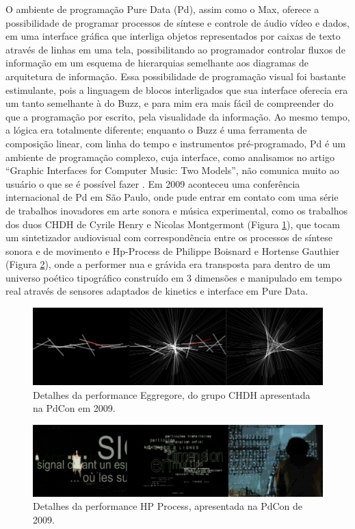 O ambiente de programação Pure Data (Pd), assim como o Max, oferece a possibilidade de programar processos de síntese e controle de áudio vídeo e dados, em uma interface gráfica que interliga objetos representados por caixas de texto através de linhas em uma tela, possibilitando ao programador controlar fluxos de informação em um esquema de hierarquias semelhante aos diagramas de arquitetura de informação. Essa possibilidade de programação visual foi bastante estimulante, pois a linguagem de blocos interligados que sua interface oferecia era um tanto semelhante à do Buzz, e para mim era mais fácil de compreender do que a programação por escrito, pela visualidade da informação. Ao mesmo tempo, a lógica era totalmente diferente; enquanto o Buzz é uma ferramenta de composição linear, com linha do tempo e instrumentos pré-programado, Pd é um ambiente de programação complexo, cuja interface, como analisamos no artigo ``Graphic Interfaces for Computer Music: Two Models'', não comunica muito ao usuário o que se é possível fazer \cite{Stolfi2016}. 
Em 2009 aconteceu uma conferência internacional de Pd em São Paulo, onde pude entrar em contato com uma série de trabalhos inovadores em arte sonora e música experimental, como os trabalhos dos duos CHDH de Cyrile Henry e Nicolas Montgermont (Figura \ref{fig:chdh}), que tocam um sintetizador audiovisual com correspondência entre os processos de síntese sonora e de movimento e Hp-Process de Philippe Boisnard e Hortense Gauthier (Figura \ref{fig:hp}), onde a performer nua e grávida era transposta para dentro de um universo poético tipográfico construído em 3 dimensões e manipulado em tempo real através de sensores adaptados de kinetics e interface em Pure Data. 

\begin{figure}
\centering
\includegraphics[width=1\textwidth]{pictures/cap1/CHDH}
\caption{Detalhes da performance Eggregore, do grupo CHDH apresentada na PdCon em 2009.}
\label{fig:chdh}
\end{figure}

\begin{figure}
\centering
\includegraphics[width=1\textwidth]{pictures/cap1/hp1}
\caption{Detalhes da performance HP Process, apresentada na PdCon de 2009.}
\label{fig:hp}
\end{figure}

